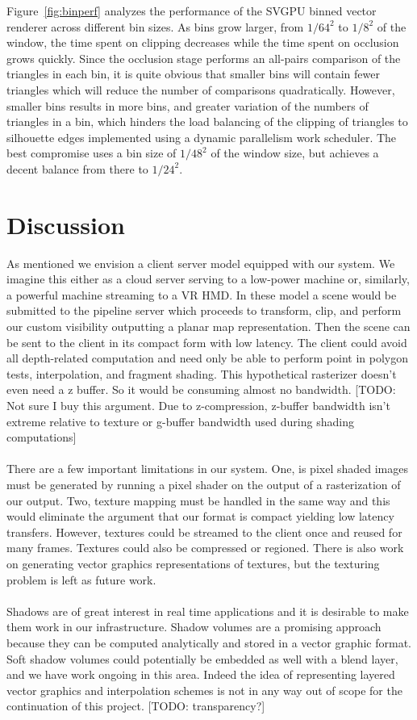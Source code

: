 \documentclass[review]{acmsiggraph}
\begin{document}
Figure~\ref{fig:binperf} analyzes the performance of the SVGPU binned vector
renderer across different bin sizes. As bins grow larger, from $1/64^2$ to
$1/8^2$ of the window, the time spent on clipping decreases while the time
spent on occlusion grows quickly. Since the occlusion stage performs an
all-pairs comparison of the triangles in each bin, it is quite obvious that
smaller bins will contain fewer triangles which will reduce the number of
comparisons quadratically. However, smaller bins results in more bins, and
greater variation of the numbers of triangles in a bin, which hinders the load
balancing of the clipping of triangles to silhouette edges implemented using a
dynamic parallelism work scheduler. The best compromise uses a bin size of
$1/48^2$ of the window size, but achieves a decent balance from there to
$1/24^2.$
 
\section{Discussion}
As mentioned we envision a client server model equipped with our system. We imagine this either as a cloud server serving to a low-power machine or, similarly, a powerful machine streaming to a VR HMD. In these model a scene would be submitted to the pipeline server which proceeds to transform, clip, and perform our custom visibility outputting a planar map representation. Then the scene can be sent to the client in its compact form with low latency. The client could avoid all depth-related computation and need only be able to perform point in polygon tests, interpolation, and fragment shading. This hypothetical rasterizer doesn’t even need a z buffer. So it would be consuming almost no bandwidth. [TODO: Not sure I buy this argument.  Due to z-compression, z-buffer bandwidth isn't extreme relative to texture or g-buffer bandwidth used during shading computations]
\\\\
There are a few important limitations in our system. One, is pixel shaded images must be generated by running a pixel shader on the output of a rasterization of our output. Two, texture mapping must be handled in the same way and this would eliminate the argument that our format is compact yielding low latency transfers. However, textures could be streamed to the client once and reused for many frames.  Textures could also be compressed or regioned. There is also work on generating vector graphics representations of textures, but the texturing problem is left as future work.
\\\\
Shadows are of great interest in real time applications and it is desirable to make them work in our infrastructure. Shadow volumes are a promising approach because they can be computed analytically and stored in a vector graphic format. Soft shadow volumes could potentially be embedded as well with a blend layer, and we have work ongoing in this area. Indeed the idea of representing layered vector graphics and interpolation schemes is not in any way out of scope for the continuation of this project. [TODO: transparency?]
\end{document}
